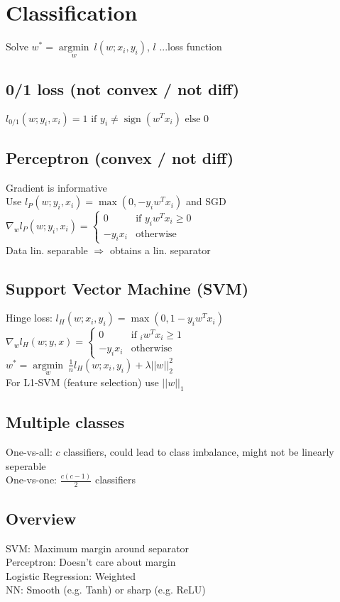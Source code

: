 \section*{Classification}

Solve $w^* = \underset{w}{\operatorname{argmin}} ~ l(w;x_i,y_i)$, $l$ ...loss function

\subsection*{0/1 loss (not convex / not diff)}
$l_{0/1} (w;y_i,x_i) = 1 \text{ if } y_i \neq \operatorname{sign}(w^Tx_i) \text{ else } 0$

\subsection*{Perceptron (convex / not diff)}
Gradient is informative\\
Use $l_P (w;y_i,x_i) = \operatorname{max}(0, -y_i w^T x_i)$ and SGD\\
$\nabla_w l_P(w;y_i,x_i) = 
\begin{cases}
    0 &\text{if } y_i w^T x_i \geq 0\\
    -y_i x_i &\text{otherwise}
\end{cases}$ \\
Data lin. separable $\Rightarrow$ obtains a lin. separator

\subsection*{Support Vector Machine (SVM)}
Hinge loss: $l_H(w;x_i,y_i) = \operatorname{max}(0,1-y_i w^T x_i)$ \\
$\nabla_w l_H(w;y,x) = 
\begin{cases}
    0 &\text{if } _i w^T x_i \geq 1\\
    -y_i x_i &\text{otherwise}
\end{cases}$\\
$w^* = \underset{w}{\operatorname{argmin}} ~ \frac{1}{n} l_H(w;x_i,y_i) + \lambda||w||_2^2$\\ For L1-SVM (feature selection) use $||w||_1$ 

\subsection*{Multiple classes}
One-vs-all: $c$ classifiers, could lead to class imbalance, might not be linearly seperable\\
One-vs-one: $\frac{c(c-1)}{2}$ classifiers

\subsection*{Overview}
SVM: Maximum margin around separator\\
Perceptron: Doesn't care about margin\\
Logistic Regression: Weighted\\
NN: Smooth (e.g. Tanh) or sharp (e.g. ReLU)